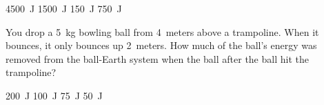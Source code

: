 \documentclass[]{exam}
\begin{document}
\begin{questions}
\begin{minipage}{0.3\textwidth}
    \centering
    \begin{randomizechoices}[norandomize]
        \choice \SI{4500}{J}
        \correctchoice \SI{1500}{J}
        \choice \SI{150}{J}
        \choice \SI{750}{J}
    \end{randomizechoices}
\end{minipage}%
\begin{minipage}{0.4\textwidth}
\centering
{}
\end{minipage}

\question
You drop a \SI{5}{kg} bowling ball from \SI{4}{meters} above a trampoline. When it bounces, it only bounces up \SI{2}{meters}. How much of the ball's energy was removed from the ball-Earth system when the ball after the ball hit the trampoline?

\begin{randomizechoices}[norandomize]
    \choice \SI{200}{J}
    \correctchoice \SI{100}{J}
    \choice \SI{75}{J}
    \choice \SI{50}{J}
\end{randomizechoices}




\end{questions}
\end{document}
